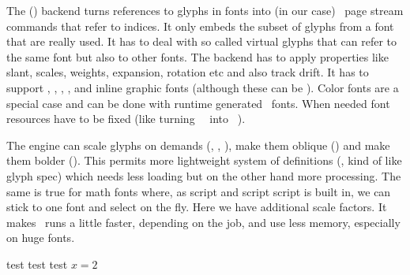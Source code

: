 \stoptitle

\starttitle[title=What does the backend]

\startitemize
\startitem
    The (\PDF) backend turns references to glyphs in fonts into (in our case)
    \PDF\ page stream commands that refer to indices.
\stopitem
\startitem
    It only embeds the subset of glyphs from a font that are really used.
\stopitem
\startitem
    It has to deal with so called virtual glyphs that can refer to the same font
    but also to other fonts.
\stopitem
\startitem
    The backend has to apply properties like slant, scales, weights, expansion,
    rotation etc and also track drift.
\stopitem
\startitem
    It has to support \TYPEONE, \OPENTYPE, \TRUETYPE, \TYPETHREE, and inline
    graphic fonts (although these can be \TYPETHREE).
\stopitem
\startitem
    Color fonts are a special case and can be done with runtime generated
    \TYPETHREE\ fonts.
\stopitem
\startitem
    When needed font resources have to be fixed (like turning \TYPEONE\ \
    into \OPENTYPE\ ).
\stopitem
\stopitemize

\stoptitle

\starttitle[title=Compact font mode]

\startitemize
\startitem
    The engine can scale glyphs on demands (\typ {\glyphscale}, \typ
    {\glyphxscale}, \typ {\glyphyscale}), make them oblique (\typ {\glyphslant})
    and make them bolder (\typ {\glyphweight}).
\stopitem
\startitem
    This permits more lightweight system of definitions (\type {\fontspecdef},
    kind of like glyph spec) which needs less loading but on the other hand more
    processing.
\stopitem
\startitem
    The same is true for math fonts where, as script and script script is built in,
    we can stick to one font and select on the fly. Here we have additional scale
    factors.
\stopitem
\startitem
    It makes \CONTEXT\ runs a little faster, depending on the job, and use less
    memory, especially on huge fonts.
\stopitem
\stopitemize

\startbuffer
test { test}  \quad
{\glyphscale 2500 test} \quad {\glyphscale 2000 \glyphweight 100
\glyphslant 200 test} \quad $x=2$ \quad {\glyphscale 1500 $x=2$}
\stopbuffer

\blank[2*big] \typebuffer

\blank[2*big] \start \getbuffer \stop

\stoptitle

\starttitle[title=Math fonts]

